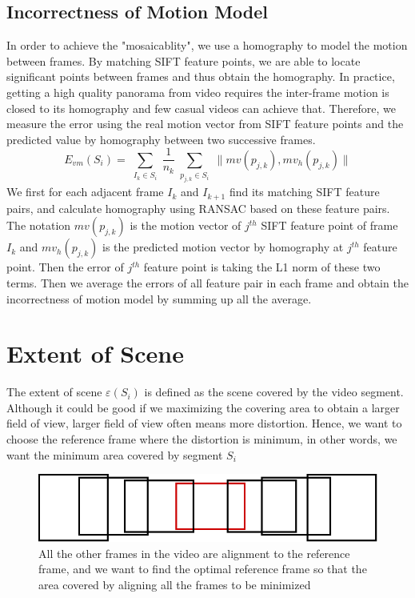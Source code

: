 \documentclass[12pt]{article}
\begin{document}
\subsection{Incorrectness of Motion Model}
In order to achieve the "mosaicablity", we use a homography to model the motion between frames. By matching SIFT feature points, we are able to locate significant points between frames and thus obtain the homography. In practice, getting a high quality panorama from video requires the inter-frame motion is closed to its homography and few casual videos can achieve that. Therefore, we measure the error using the real motion vector from SIFT feature points and the predicted value by homography between two successive frames.
\begin{equation}
\mathit{E_{vm}(S_i)} = \sum_{\substack{\mathit{I_k\in S_i}}} \frac{1}{\mathit{n_k}} \sum_{\substack{\mathit{p_{j,k}}\in \mathit{S_i}}} \lVert \mathit{mv(p_{j,k})}, \mathit{mv_h(p_{j,k})} \rVert
\end{equation}
We first for each adjacent frame $\mathit{I_k}$ and $\mathit{I_{k + 1}}$ find its matching SIFT feature pairs, and calculate homography using RANSAC based on these feature pairs. The notation $\mathit{mv(p_{j,k})}$ is the motion vector of $\mathit{j^{th}}$ SIFT feature point of frame $\mathit{I_k}$ and $\mathit{mv_h(p_{j,k})}$ is the predicted motion vector by homography at $\mathit{j^{th}}$ feature point. Then the error of $\mathit{j^{th}}$ feature point is taking the L1 norm of these two terms. Then we average the errors of all feature pair in each frame and obtain the incorrectness of motion model by summing up all the average. 
 
 \section{Extent of Scene}
 	The extent of scene $\varepsilon(\mathit{S_i})$ is defined as the scene covered by the video segment. Although it could be good if we maximizing the covering area to obtain a larger field of view, larger field of view often means more distortion. Hence, we want to choose the reference frame where the distortion is minimum, in other words, we want the minimum area covered by segment $\mathit{S_i}$
	
\begin{figure}[h]
	\centering
	\includegraphics[width=15cm]{reference}
	\caption{All the other frames in the video are alignment to the reference frame, and we want to find the optimal reference frame so that the area covered by aligning all the frames to be minimized}
\end{figure}
\end{document}
